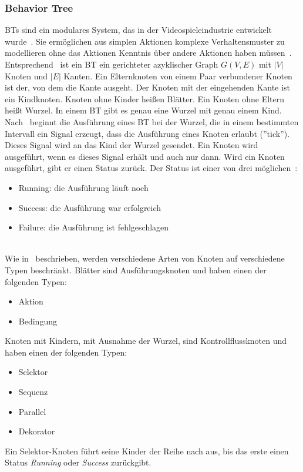 \subsubsection{Behavior Tree}
\acp{BT} sind ein modulares System, das in der Videospieleindustrie entwickelt wurde~\cite{bt_book}.
Sie ermöglichen aus simplen Aktionen komplexe Verhaltensmuster zu modellieren ohne das Aktionen Kenntnis über andere Aktionen haben müssen~\cite{bt_robotics}.
Entsprechend~\cite{bt_1} ist ein \ac{BT} ein gerichteter azyklischer Graph $G(V,E)$ mit $|V|$ Knoten und $|E|$ Kanten.
Ein Elternknoten von einem Paar verbundener Knoten ist der, von dem die Kante ausgeht.
Der Knoten mit der eingehenden Kante ist ein Kindknoten.
Knoten ohne Kinder heißen Blätter.
Ein Knoten ohne Eltern heißt Wurzel.
In einem \ac{BT} gibt es genau eine Wurzel mit genau einem Kind.\\
Nach~\cite{bt_book} beginnt die Ausführung eines \ac{BT} bei der Wurzel, die in einem bestimmten Intervall ein Signal erzeugt, dass die Ausführung eines Knoten erlaubt (''tick'').
Dieses Signal wird an das Kind der Wurzel gesendet.
Ein Knoten wird ausgeführt, wenn es dieses Signal erhält und auch nur dann.
Wird ein Knoten ausgeführt, gibt er einen Status zurück.
Der Status ist einer von drei möglichen~\cite{bt_uav}:
\begin{itemize}
    \item Running: die Ausführung läuft noch
    \item Success: die Ausführung war erfolgreich
    \item Failure: die Ausführung ist fehlgeschlagen
\end{itemize}\\
Wie in~\cite{bt_1} beschrieben, werden verschiedene Arten von Knoten auf verschiedene Typen beschränkt.
Blätter sind Ausführungsknoten und haben einen der folgenden Typen:
\begin{itemize}
    \item Aktion
    \item Bedingung
\end{itemize}
Knoten mit Kindern, mit Ausnahme der Wurzel, sind Kontrollflussknoten und haben einen der folgenden Typen:
\begin{itemize}
    \item Selektor
    \item Sequenz
    \item Parallel
    \item Dekorator
\end{itemize}
Ein Selektor-Knoten führt seine Kinder der Reihe nach aus, bis das erste einen Status \emph{Running} oder \emph{Success} zurückgibt.
